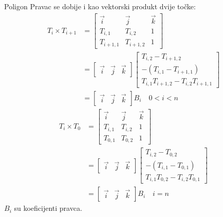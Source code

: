 \documentclass[9pt]{beamer}
\begin{document}
\begin{frame}{Poligon}
	Pravac se dobije i kao vektorski produkt dvije točke:
	\begin{align*}
	T_i \times T_{i+1} & = \begin{bmatrix}
	 		\vec{i} & \vec{j}  & \vec{k}\\ 
	 		T_{i, 1} & T_{i, 2} & 1 \\
	 		T_{i+1, 1} & T_{i+1, 2} & 1 \end{bmatrix} \\
	 		 & = \begin{bmatrix}
	 		 \vec{i} & \vec{j}  & \vec{k}
	 		 \end{bmatrix} 
	 		 \begin{bmatrix}
	 		 T_{i, 2} - T_{i+1, 2}\\
	 		 -(T_{i, 1} - T_{i+1, 1})\\
	 		 T_{i,1}T_{i+1, 2}- T_{i,2}T_{i+1, 1} 
	 		 \end{bmatrix} \\
	 		 & = \begin{bmatrix}
	 		 \vec{i} & \vec{j}  & \vec{k}
	 		 \end{bmatrix}B_i \quad 0 < i < n
	\end{align*}
	\begin{align*}
	T_i \times T_0 & = \begin{bmatrix}
		\vec{i} & \vec{j}  & \vec{k}\\ 
		T_{i, 1} & T_{i, 2} & 1 \\
		T_{0, 1} & T_{0, 2} & 1 \end{bmatrix} \\
	& = \begin{bmatrix}
		\vec{i} & \vec{j}  & \vec{k}
	\end{bmatrix} 
	\begin{bmatrix}
		T_{i, 2} - T_{0, 2}\\
		-(T_{i, 1} - T_{0, 1})\\
		T_{i,1}T_{0, 2}- T_{i,2}T_{0, 1} 
	\end{bmatrix} \\
	& = \begin{bmatrix}
		\vec{i} & \vec{j}  & \vec{k}
	\end{bmatrix}B_i \quad i = n
\end{align*}
$B_i$ su koeficijenti pravca.
\end{frame}
\end{document}
